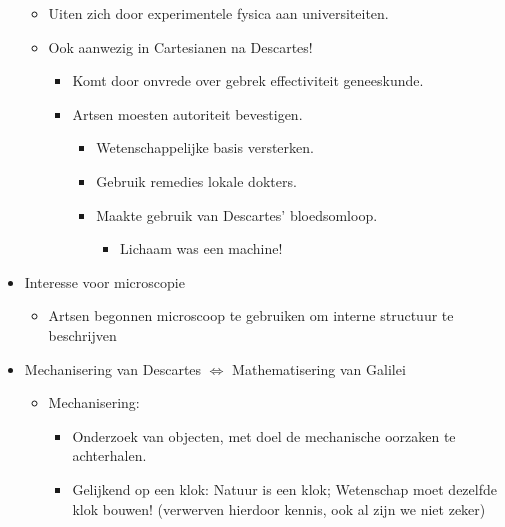 \documentclass{article}
\begin{document}
\begin{itemize}
\begin{itemize}
        \item Uiten zich door experimentele fysica aan universiteiten.
        \item Ook aanwezig in Cartesianen na Descartes!
        \begin{itemize}
          \item Komt door onvrede over gebrek effectiviteit geneeskunde.
          \item Artsen moesten autoriteit bevestigen.
          \begin{itemize}
            \item Wetenschappelijke basis versterken.
            \item Gebruik remedies lokale dokters.
            \item Maakte gebruik van Descartes' bloedsomloop.
            \begin{itemize}
              \item Lichaam was een machine!
            \end{itemize}
          \end{itemize}
        \end{itemize}
      \end{itemize}
      \item Interesse voor microscopie
      \begin{itemize}
        \item Artsen begonnen microscoop te gebruiken om interne structuur te beschrijven
      \end{itemize}
      \item Mechanisering van Descartes $\Leftrightarrow$ Mathematisering van Galilei
      \begin{itemize}
        \item Mechanisering:
        \begin{itemize}
          \item Onderzoek van objecten, met doel de mechanische oorzaken te achterhalen.
          \item Gelijkend op een klok: Natuur is een klok; Wetenschap moet dezelfde klok bouwen! (verwerven hierdoor kennis, ook al zijn we niet zeker)
        \end{itemize}
      \end{itemize}
    \end{itemize}

  \newpage
\end{document}
